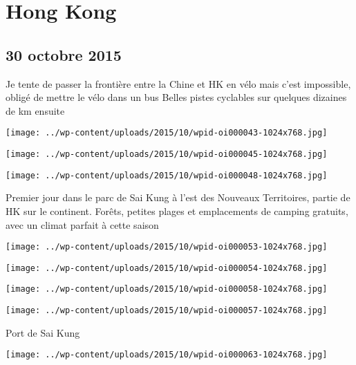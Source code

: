 \chapter{Hong Kong}
\section*{30 octobre 2015}
Je tente de passer la frontière entre la Chine et HK en vélo mais c'est impossible, obligé de mettre le vélo dans un bus \newline
 Belles pistes cyclables sur quelques dizaines de km ensuite \newline
 \newline
\centerline{\texttt{[image: ../wp-content/uploads/2015/10/wpid-oi000043-1024x768.jpg]} } 
 \newline
 \newline
\centerline{\texttt{[image: ../wp-content/uploads/2015/10/wpid-oi000045-1024x768.jpg]} } 
 \newline
 \newline
\centerline{\texttt{[image: ../wp-content/uploads/2015/10/wpid-oi000048-1024x768.jpg]} } 
 \newline
 Premier jour dans le parc de Sai Kung à l'est des Nouveaux Territoires, partie de HK sur le continent. Forêts, petites plages et emplacements de camping gratuits, avec un climat parfait à cette saison \newline
 \newline
\centerline{\texttt{[image: ../wp-content/uploads/2015/10/wpid-oi000053-1024x768.jpg]} } 
 \newline
 \newline
\centerline{\texttt{[image: ../wp-content/uploads/2015/10/wpid-oi000054-1024x768.jpg]} } 
 \newline
 \newline
\centerline{\texttt{[image: ../wp-content/uploads/2015/10/wpid-oi000058-1024x768.jpg]} } 
 \newline
 \newline
\centerline{\texttt{[image: ../wp-content/uploads/2015/10/wpid-oi000057-1024x768.jpg]} } 
 \newline
 Port de Sai Kung \newline
 \newline
\centerline{\texttt{[image: ../wp-content/uploads/2015/10/wpid-oi000063-1024x768.jpg]} } 
 \newline
